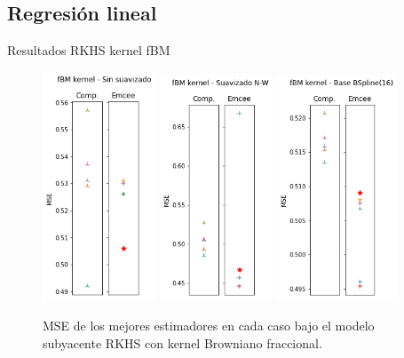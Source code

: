 \documentclass[10pt, professionalfonts]{beamer}
\begin{document}
\subsection{Regresión lineal}

\begin{frame}{Resultados RKHS kernel fBM}
  \begin{figure}
    \includegraphics[width=0.3\textwidth]{img/results-new/reg_rkhs_fbm_none}\hfill
    \includegraphics[width=0.3\textwidth]{img/results-new/reg_rkhs_fbm_nw}\hfill
    \includegraphics[width=0.32\textwidth]{img/results-new/reg_rkhs_fbm_basis}
    \caption{MSE de los mejores estimadores en cada caso bajo el modelo subyacente RKHS con kernel Browniano fraccional.}
  \end{figure}
\end{frame}
\end{document}
